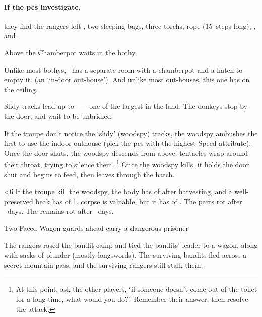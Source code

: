 \documentclass[10pt,twoside]{book}
\begin{document}
\paragraph{If the \glspl{pc} investigate,}
they find the \glspl{ranger} left \lootMedium, two sleeping bags, three \glspl{torch}, rope (15~\glspl{step} long), \rations, and \rations.

{Above the Chamberpot}%
{ waits in the \gls{bothy}}%

\woodspy

Unlike most \glspl{bothy}, \bothyTwo\ has a separate room with a chamberpot and a hatch to empty it.
(an `in-door out-house').
And unlike most out-houses, this one has  on the ceiling.

\begin{boxtext}
  Slidy-tracks lead up to \bothyTwo\ --- one of the largest in the land.
  The donkeys stop by the door, and wait to be unbridled.
\end{boxtext}

If the troupe don't notice the `slidy' (\gls{woodspy}) tracks, the \gls{woodspy} ambushes the first to use the indoor-outhouse (pick the \glspl{pc} with the highest Speed \gls{attribute}).
Once the door shuts, the \gls{woodspy} descends from above;
tentacles wrap around their throat, trying to silence them.%
\footnote{At this point, ask the other players, `if someone doesn't come out of the toilet for a long time, what would you do?'.
Remember their answer, then resolve the attack.}
Once the \gls{woodspy} kills, it holds the door shut and begins to feed, then leaves through the hatch.

\ifnum\thepage<6%
  If the troupe kill the \gls{woodspy}, the body has  of  after \gls{harvesting}, and a well-preserved beak has  of 1.%
\else%
   corpse is valuable, but it has  of .
\fi%
\ifcase\thetemperature\relax\or
  The parts rot after ~days.
\else%
  The remains rot after ~days.
\fi

{Two-Faced Wagon}%
{\Glspl{guard} ahead carry a dangerous prisoner}%

\begin{exampletext}
  The \glspl{ranger} rased the bandit camp and tied the bandits' leader to a wagon, along with sacks of plunder (mostly longswords).
  The surviving bandits fled across a secret mountain pass, and the surviving \glspl{ranger} still stalk them.
\end{exampletext}
\end{document}
